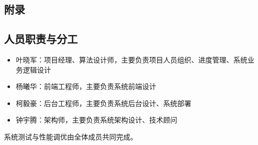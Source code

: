 \begin{center}
  \section{附录}
\end{center}

\subsection{人员职责与分工}
\begin{itemize}
  \item 叶晓军：项目经理、算法设计师，主要负责项目人员组织、进度管理、系统业务逻辑设计
  \item 杨曦华：前端工程师，主要负责系统前端设计
  \item 柯毅豪：后台工程师，主要负责系统后台设计、系统部署
  \item 钟宇腾：架构师，主要负责系统架构设计、技术顾问
\end{itemize}
系统测试与性能调优由全体成员共同完成。
